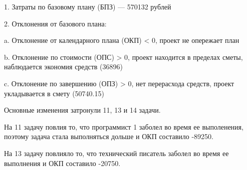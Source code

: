 1. Затраты по базовому плану (БПЗ) –-- 570132 рублей

2. Отклонения от базового плана:

a. Отклонение от календарного плана (ОКП) < 0, проект не опережает
план

b. Отклонение по стоимости (ОПС) > 0, проект находится в пределах
сметы, наблюдается экономия средств (36896)

c. Отклонение по завершению (ОПЗ) > 0, нет перерасхода средств,
проект укладывается в смету (50740.15)


Основные изменения затронули 11, 13 и 14 задачи.

На 11 задачу повлия то, что программист 1 заболел во время ее выполенения, поэтому задача стала выполняться дольше и ОКП составило -89250.

На 13 задачу повлияло то, что технический писатель заболел во время ее выполнения и ОКП составило -20750.